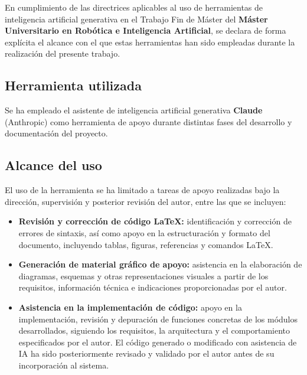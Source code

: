 \label{chap:ia}

En cumplimiento de las directrices aplicables al uso de herramientas de inteligencia artificial
generativa en el Trabajo Fin de Máster del \textbf{Máster Universitario en Robótica e Inteligencia
Artificial}, se declara de forma explícita el alcance con el que estas herramientas han sido
empleadas durante la realización del presente trabajo.


\subsection*{Herramienta utilizada}

Se ha empleado el asistente de inteligencia artificial generativa \textbf{Claude} (Anthropic) como
herramienta de apoyo durante distintas fases del desarrollo y documentación del proyecto.


\subsection*{Alcance del uso}

El uso de la herramienta se ha limitado a tareas de apoyo realizadas bajo la dirección, supervisión
y posterior revisión del autor, entre las que se incluyen:

\begin{itemize}

	\item \textbf{Revisión y corrección de código \LaTeX:} identificación y corrección de errores de
	sintaxis, así como apoyo en la estructuración y formato del documento, incluyendo tablas,
	figuras, referencias y comandos \LaTeX.

	\item \textbf{Generación de material gráfico de apoyo:} asistencia en la elaboración de
	diagramas, esquemas y otras representaciones visuales a partir de los requisitos, información
	técnica e indicaciones proporcionadas por el autor.

	\item \textbf{Asistencia en la implementación de código:} apoyo en la implementación, revisión y
	depuración de funciones concretas de los módulos desarrollados, siguiendo los requisitos, la
	arquitectura y el comportamiento especificados por el autor. El código generado o modificado con
	asistencia de IA ha sido posteriormente revisado y validado por el autor antes de su
	incorporación al sistema.

\end{itemize}


